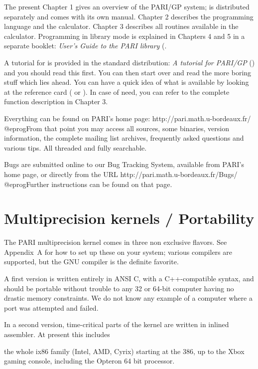 The present Chapter 1 gives an overview of the PARI/GP system;  is
distributed separately and comes with its own manual. Chapter 2 describes the
 programming language and the  calculator. Chapter 3
describes all routines available in the calculator. Programming in library
mode is explained in Chapters 4 and 5 in a separate booklet: \emph{User's
Guide to the PARI library} (.

A tutorial for  is provided in the standard distribution: \emph{A
tutorial for PARI/GP} () and you should read this first.
You can then start over and read the more boring stuff which lies ahead. You
can have a quick idea of what is available by looking at the 
reference card ( or ). In case of need, you
can refer to the complete function description in Chapter 3.

 Everything can be found on
PARI's home page:
\bprog
  http://pari.math.u-bordeaux.fr/
@eprog\noindent From that point you may access all sources, some binaries,
version information, the complete mailing list archives, frequently asked
questions and various tips. All threaded and fully searchable.

 Bugs are submitted online to our Bug
Tracking System, available from PARI's home page, or directly from the URL
\bprog
  http://pari.math.u-bordeaux.fr/Bugs/
@eprog\noindent Further instructions can be found on that page.

\section{Multiprecision kernels / Portability}

The PARI multiprecision kernel comes in three non exclusive flavors. See
Appendix~A for how to set up these on your system; various compilers are
supported, but the GNU  compiler is the definite favorite.

A first version is written entirely in ANSI C, with a C++-compatible syntax,
and should be portable without trouble to any 32 or 64-bit computer having no
drastic memory constraints. We do not know any example of a computer where a
port was attempted and failed.

In a second version, time-critical parts of the kernel are written in
inlined assembler. At present this includes

\item the whole ix86 family (Intel, AMD, Cyrix) starting at the 386, up to
the Xbox gaming console, including the Opteron 64 bit processor.

